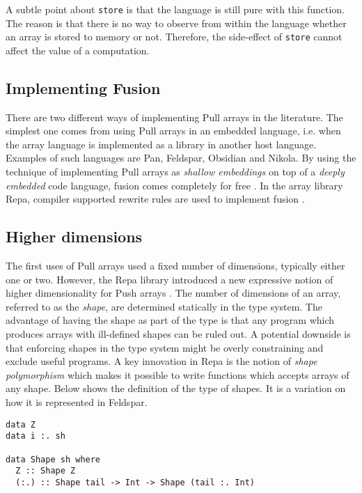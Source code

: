 \documentclass[preprint]{sigplanconf}
\begin{document}
A subtle point about \verb!store! is that the language is still pure
with this function. The reason is that there is no way to observe from
within the language whether an array is stored to memory or
not. Therefore, the side-effect of \verb!store! cannot affect the
value of a computation.

\subsection{Implementing Fusion}

There are two different ways of implementing Pull arrays in the
literature. The simplest one comes from using Pull arrays in an
embedded language, i.e. when the array language is implemented as a
library in another host language. Examples of such languages are
Pan\cite{elliott2003compiling}, Feldspar\cite{Axelsson:2010:Feldspar},
Obsidian\cite{Svensson:2011:Obsidian} and
Nikola\cite{Mainland:2010:Nikola}. By using the technique of
implementing Pull arrays as \emph{shallow embeddings} on top of a
\emph{deeply embedded} code language, fusion comes completely for free
\cite{svenningsson2013combining}.
In the array library Repa\cite{keller2010regular}, compiler supported
rewrite rules are used to implement fusion \cite{jones2001playing}.


\subsection{Higher dimensions}

The first uses of Pull arrays used a fixed number of dimensions,
typically either one or two. However, the Repa library introduced a
new expressive notion of higher dimensionality for Push arrays
\cite{keller2010regular}. The number of dimensions of an array, referred
to as the \emph{shape}, are determined statically in the type
system. The advantage of having the shape as part of the type is that
any program which produces arrays with ill-defined shapes can be ruled
out. A potential downside is that enforcing shapes in the type system might
be overly constraining and exclude useful programs. A key innovation in
Repa is the notion of \emph{shape polymorphism} which makes it
possible to write functions which accepts arrays of any shape. Below
shows the definition of the type of shapes. It is a variation on how
it is represented in Feldspar.

\begin{small}
\begin{Verbatim}
data Z
data i :. sh

data Shape sh where
  Z :: Shape Z
  (:.) :: Shape tail -> Int -> Shape (tail :. Int)
\end{Verbatim}
\end{small}
\end{document}

